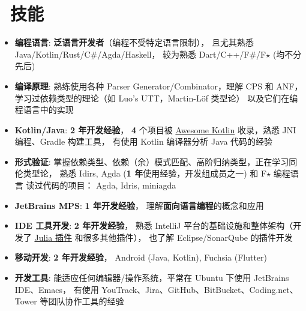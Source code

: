 \documentclass{resume}
\begin{document}
\section{\faCogs\ 技能}
\begin{itemize}[parsep=0.25ex]
  \item \textbf{编程语言}:
    \textbf{泛语言开发者}（编程不受特定语言限制），
    且尤其熟悉 Java/Kotlin/Rust/C\#/Agda/Haskell，
    较为熟悉 Dart/C++/F\#/F$\star$ (均不分先后)

  \item \textbf{编译原理}:
    熟练使用各种 Parser Generator/Combinator，理解 CPS 和 ANF，
    学习过依赖类型的理论（如 Luo's UTT，Martin-Löf 类型论）
    以及它们在编程语言中的实现

  \item \textbf{Kotlin/Java}:
    \textbf{2 年开发经验}，
    \textbf{4} 个项目被
    \href{https://kotlin.link/?q=ice} {Awesome Kotlin}
    收录，熟悉 JNI 编程、Gradle 构建工具，
    有使用 Kotlin 编译器分析 Java 代码的经验

  \item \textbf{形式验证}:
    掌握依赖类型、依赖（余）模式匹配、高阶归纳类型，正在学习同伦类型论，
    熟悉 Idirs, Agda (\textbf{1 年}使用经验，开发组成员之一)
    和 F$\star$ 编程语言
    \subitem 读过代码的项目： Agda, Idris, miniagda

  \item \textbf{JetBrains MPS}:
    \textbf{1 年开发经验}，
    理解\textbf{面向语言编程}的概念和应用

  \item \textbf{IDE 工具开发}:
    \textbf{2 年开发经验}，
    熟悉 IntelliJ 平台的基础设施和整体架构（开发了
      \href{https://plugins.jetbrains.com/plugin/10413-julia}
           {Julia 插件} 和很多其他插件），
    也了解 Eclipse/SonarQube 的插件开发

  \item \textbf{移动开发}:
    \textbf{2 年开发经验}，
    Android (Java, Kotlin), Fuchsia (Flutter)

  \item \textbf{开发工具}:
    能适应任何编辑器/操作系统，平常在 Ubuntu 下使用 JetBrains IDE、Emacs，
    有使用 YouTrack、Jira、GitHub、BitBucket、Coding.net、Tower 等团队协作工具的经验
\end{itemize}

\end{document}
